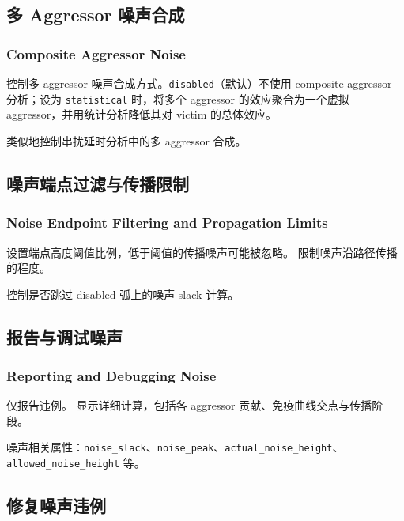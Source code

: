 \subsection{多 Aggressor 噪声合成}
\subsubsection*{Composite Aggressor Noise}

 控制多 aggressor 噪声合成方式。\texttt{disabled}（默认）不使用 composite aggressor 分析；设为 \texttt{statistical} 时，将多个 aggressor 的效应聚合为一个虚拟 aggressor，并用统计分析降低其对 victim 的总体效应。

 类似地控制串扰延时分析中的多 aggressor 合成。

\subsection{噪声端点过滤与传播限制}
\subsubsection*{Noise Endpoint Filtering and Propagation Limits}

 设置端点高度阈值比例，低于阈值的传播噪声可能被忽略。 限制噪声沿路径传播的程度。

 控制是否跳过 disabled 弧上的噪声 slack 计算。

\subsection{报告与调试噪声}
\subsubsection*{Reporting and Debugging Noise}

 仅报告违例。 显示详细计算，包括各 aggressor 贡献、免疫曲线交点与传播阶段。

噪声相关属性：\texttt{noise\_slack}、\texttt{noise\_peak}、\texttt{actual\_noise\_height}、\texttt{allowed\_noise\_height} 等。

\subsection{修复噪声违例}
